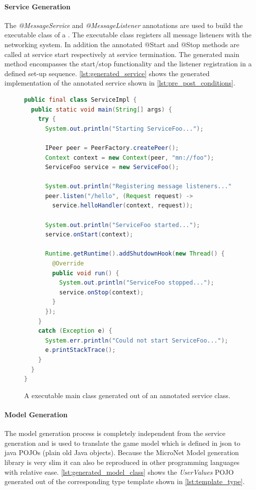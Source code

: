 \paragraph{Service Generation}

The \textit{@MessageService} and \textit{@MessageListener} annotations are used
to build the executable class of a \ms{}. The executable class registers all
message listeners with the networking system. In addition the annotated @Start
and @Stop methods are called at service start respectively at service
termination. The generated main method encompasses the start/stop functionality
and the listener registration in a defined set-up sequence.
\autoref{lst:generated_service} shows the generated implementation of the
annotated service shown in \autoref{lst:pre_post_conditions}.

\begin{figure}
\begin{lstlisting}[language=Java,firstnumber=1] 
public final class ServiceImpl {
  public static void main(String[] args) {
    try {
      System.out.println("Starting ServiceFoo...");

      IPeer peer = PeerFactory.createPeer();
      Context context = new Context(peer, "mn://foo");
      ServiceFoo service = new ServiceFoo();

      System.out.println("Registering message listeners...");
      peer.listen("/hello", (Request request) -> 
      	service.helloHandler(context, request));

      System.out.println("ServiceFoo started...");
      service.onStart(context);

      Runtime.getRuntime().addShutdownHook(new Thread() {
        @Override
        public void run() {
          System.out.println("ServiceFoo stopped...");
          service.onStop(context);
        }
      });
    }
    catch (Exception e) {
      System.err.println("Could not start ServiceFoo...");
      e.printStackTrace();
    }
  }
}
\end{lstlisting}
\caption{A executable \ms{} main class generated out of an annotated service
class.}
\label{lst:generated_service}
\end{figure}

\paragraph{Model Generation}

The model generation process is completely independent from the service
generation and is used to translate the game model which is defined in
\gls{json} to java POJOs (plain old Java objects). Because the MicroNet Model
generation library is very slim it can also be reproduced in other programming
languages with relative ease. \autoref{lst:generated_model_class} shows the
\textit{UserValues} POJO generated out of the corresponding type template shown
in \autoref{lst:template_type}.

